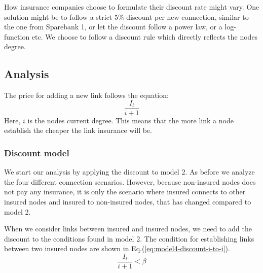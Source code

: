How insurance companies choose to formulate their discount rate might vary. One solution might be to follow a strict 5$\%$ discount per new connection, similar to the one from Sparebank 1, or let the discount follow a power law, or a log-function etc. We choose to follow a discount rule which directly reflects the nodes degree.
\subsection{Analysis}
The price for adding a new link follows the equation:
\begin{equation}
\frac{I_{l}}{i+1}
\label{eq:discount0}
\end{equation}
Here, $i$ is the nodes current degree. This means that the more link a node establish the cheaper the link insurance will be. 
\subsubsection{Discount model}
We start our analysis by applying the discount to model 2. As before we analyze the four different connection scenarios. However, because non-insured nodes does not pay any insurance, it is only the scenario where insured connects to other insured nodes and insured to non-insured nodes, that has changed compared to model 2.

When we consider links between insured and insured nodes, we need to add the discount to the conditions found in model 2. The condition for establishing links between two insured nodes are shown in Eq.(\ref{eq:model4-discount-i-to-i}).
\begin{equation}
\frac{I_{l}}{i+1}<\beta
\label{eq:model4-discount-i-to-i}
\end{equation}

